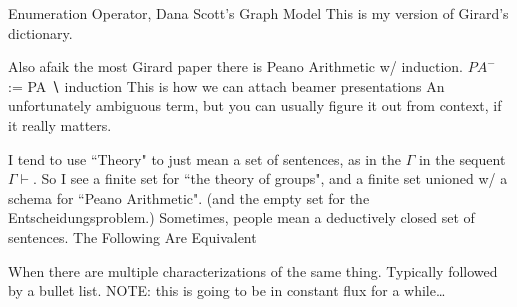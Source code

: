 \documentclass[
	fontsize=10pt, %
	twoside=false, %
	secnumdepth=-1, %
]{kaobook}
\theoremstyle{break}
\begin{document}
    \See Enumeration Operator, Dana Scott's Graph Model
    This is my version of Girard's dictionary.

    Also afaik the most Girard paper there is
    Peano Arithmetic w/ induction.
    $PA^-$ := PA ∖ induction
    This is how we can attach beamer presentations
    An unfortunately ambiguous term,
    but you can usually figure it out from context,
    if it really matters.

    I tend to use ``Theory" to just mean a set of sentences,
    as in the $Γ$ in the sequent $Γ ⊢ $.
    So I see a finite set for ``the theory of groups",
    and a finite set unioned w/ a schema for ``Peano Arithmetic".
    (and the empty set for the Entscheidungsproblem.)
    Sometimes, people mean a deductively closed set of sentences.
    The Following Are Equivalent

    When there are multiple characterizations of the same thing.
    Typically followed by a bullet list.
    NOTE: this is going to be in constant flux for a while…
\end{document}
